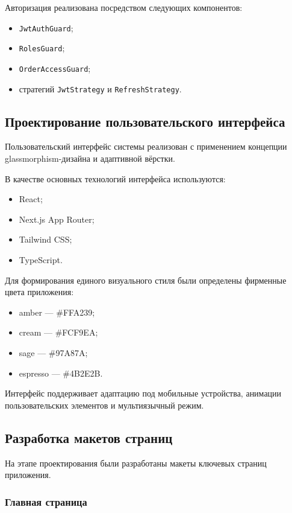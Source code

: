Авторизация реализована посредством следующих компонентов:

\begin{itemize}
	\item \texttt{JwtAuthGuard};
	\item \texttt{RolesGuard};
	\item \texttt{OrderAccessGuard};
	\item стратегий \texttt{JwtStrategy} и \texttt{RefreshStrategy}.
\end{itemize}

\subsection{Проектирование пользовательского интерфейса}

Пользовательский интерфейс системы реализован с применением
концепции glassmorphism-дизайна и адаптивной вёрстки.

В качестве основных технологий интерфейса используются:

\begin{itemize}
	\item React;
	\item Next.js App Router;
	\item Tailwind CSS;
	\item TypeScript.
\end{itemize}

Для формирования единого визуального стиля были определены
фирменные цвета приложения:

\begin{itemize}
	\item amber --- \#FFA239;
	\item cream --- \#FCF9EA;
	\item sage --- \#97A87A;
	\item espresso --- \#4B2E2B.
\end{itemize}

Интерфейс поддерживает адаптацию под мобильные устройства,
анимации пользовательских элементов и мультиязычный режим.

\subsection{Разработка макетов страниц}

На этапе проектирования были разработаны макеты
ключевых страниц приложения.

\subsubsection{Главная страница}

